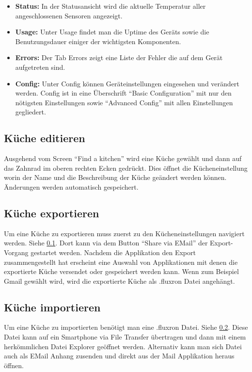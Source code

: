 \begin{itemize}
\item \textbf{Status:}
In der Statusansicht wird die aktuelle Temperatur aller angeschlossenen Sensoren angezeigt. \\
\item \textbf{Usage:}
Unter Usage findet man die Uptime des Geräts sowie die Benutzungsdauer einiger der wichtigsten Komponenten. \\

\item \textbf{Errors:}
Der Tab Errors zeigt eine Liste der Fehler die auf dem Gerät aufgetreten sind. \\

\item \textbf{Config:}
Unter Config können Geräteinstellungen eingesehen und verändert werden. Config ist in eine Überschrift \enquote{Basic Configuration} mit nur den nötigsten Einstellungen sowie \enquote{Advanced Config} mit allen Einstellungen gegliedert.
\end{itemize}

\WFclear
\subsection{Küche editieren}
\label{subsec:kuecheEditieren}
Ausgehend vom Screen \enquote{Find a kitchen} wird eine Küche gewählt und dann auf das Zahnrad im oberen rechten Ecken gedrückt. Dies öffnet die Kücheneinstellung worin der Name und die Beschreibung der Küche geändert werden können. Änderungen werden automatisch gespeichert.

\subsection{Küche exportieren}
\label{subsec:kuecheExportieren}
Um eine Küche zu exportieren muss zuerst zu den Kücheneinstellungen navigiert werden. Siehe \ref{subsec:kuecheEditieren}. Dort kann via dem Button \enquote{Share via EMail} der Export-Vorgang gestartet werden. Nachdem die Applikation den Export zusammengestellt hat erscheint eine Auswahl von Applikationen mit denen die exportierte Küche versendet oder gespeichert werden kann. Wenn zum Beispiel Gmail gewählt wird, wird die exportierte Küche als .fluxron Datei angehängt. 

\subsection{Küche importieren}
Um eine Küche zu importierten benötigt man eine .fluxron Datei. Siehe \ref{subsec:kuecheExportieren}. Diese Datei kann auf ein Smartphone via File Transfer übertragen und dann mit einem herkömmlichen Datei Explorer geöffnet werden. Alternativ kann man sich Datei auch als EMail Anhang zusenden und direkt aus der Mail Applikation heraus öffnen.

